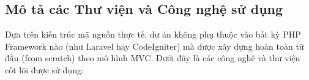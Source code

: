 \documentclass[pt = 12,a4paper]{article}
\begin{document}

\subsection{Mô tả các Thư viện và Công nghệ sử dụng}
Dựa trên kiến trúc mã nguồn thực tế, dự án không phụ thuộc vào bất kỳ PHP Framework nào (như Laravel hay CodeIgniter) mà được xây dựng hoàn toàn từ đầu (from scratch) theo mô hình MVC. Dưới đây là các công nghệ và thư viện cốt lõi được sử dụng:
\end{document}
